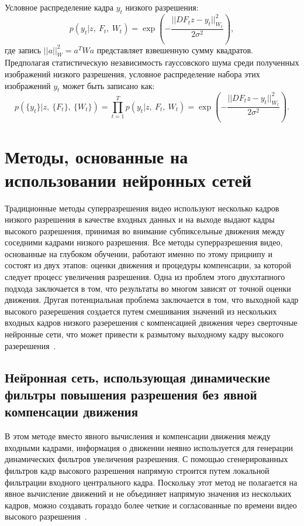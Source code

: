 \documentclass{bmstu}
\begin{document}
Условное распределение кадра $y_t$ низкого разрешения:
\begin{equation}
p(y_t|z,~F_t,~W_t) = \exp(-\frac{||DF_{t}z - y_t||_{W_t}^{2}}{2 \sigma^2}),
\end{equation}
где запись $||a||_{W}^2 = a^{T}Wa$ представляет взвешенную сумму квадратов. 
Предполагая статистическую независимость гауссовского шума среди полученных изображений низкого разрешения, условное распределение набора этих изображений $y_t$ может быть записано как:
\begin{equation}
p(\{y_t\}|z,~\{F_t\},~\{W_t\}) = \prod_{t = 1}^{T} p(y_t|z,~F_t,~W_t) = \exp(-\frac{||DF_{t}z - y_t||_{W_t}^{2}}{2 \sigma^2}).
\end{equation}



\section{Методы, основанные на использовании нейронных сетей}

Традиционные методы суперразрешения видео используют несколько кадров низкого разрешения в качестве входных данных и на выходе выдают кадры высокого разрешения, принимая во внимание субпиксельные движения между соседними кадрами низкого разрешения. 
Все методы суперразрешения видео, основанные на глубоком обучении, работают именно по этому прицнипу и состоят из двух этапов: оценки движения и процедуры компенсации, за которой следует процесс увеличения разрешения. 
Одна из проблем этого двухэтапного подхода заключается в том, что результаты во многом зависят от точной оценки движения. 
Другая потенциальная проблема заключается в том, что выходной кадр высокого разерешения создается путем смешивания значений из нескольких входных кадров низкого разерешения с компенсацией движения через сверточные нейронные сети, что может привести к размытому выходному кадру высокого разерешения~\cite{Younghyun2018}.

\subsection{Нейронная сеть, использующая динамические фильтры повышения разрешения без явной компенсации движения}

В этом методе вместо явного вычисления и компенсации движения между входными кадрами, информация о движении неявно используется для генерации динамических фильтров увеличения разрешения. 
С помощью сгенерированных фильтров кадр высокого разрешения напрямую строится путем локальной фильтрации входного центрального кадра. 
Поскольку этот метод не полагается на явное вычисление движений и не объединяет напрямую значения из нескольких кадров, можно создавать гораздо более четкие и согласованные по времени видео высокого разрешения~\cite{Younghyun2018}.
\end{document}
